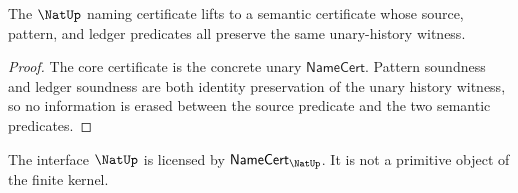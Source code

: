 \begin{theorem}
\label{thm:natup-semantic-namecert}
The \(\NatUp\) naming certificate lifts to a semantic certificate whose source,
pattern, and ledger predicates all preserve the same unary-history witness.
\end{theorem}
\begin{proof}
The core certificate is the concrete unary \(\mathsf{NameCert}\). Pattern
soundness and ledger soundness are both identity preservation of the unary
history witness, so no information is erased between the source predicate and
the two semantic predicates.
\end{proof}

\begin{corollary}
\label{cor:natup-licensed-not-primitive}
The interface \(\NatUp\) is licensed by \(\mathsf{NameCert}_{\NatUp}\). It is not a primitive object of the finite kernel.
\end{corollary}

